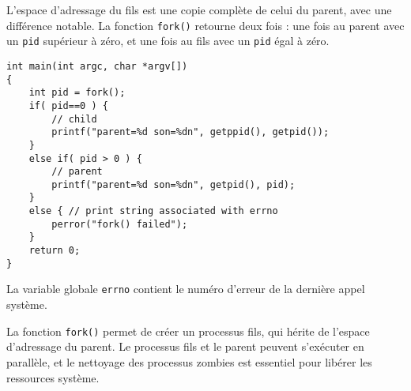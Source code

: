 \documentclass[12pt]{article}
\begin{document}
L'espace d'adressage du fils est une copie complète de celui du parent, avec une différence notable. La fonction \texttt{fork()} retourne deux fois : une fois au parent avec un \texttt{pid} supérieur à zéro, et une fois au fils avec un \texttt{pid} égal à zéro.

\begin{lstlisting}
int main(int argc, char *argv[])
{
    int pid = fork();
    if( pid==0 ) {
        // child
        printf("parent=%d son=%dn", getppid(), getpid());
    }
    else if( pid > 0 ) {
        // parent
        printf("parent=%d son=%dn", getpid(), pid);
    }
    else { // print string associated with errno
        perror("fork() failed");
    }
    return 0;
}
\end{lstlisting}

La variable globale \texttt{errno} contient le numéro d'erreur de la dernière appel système.

\begin{tcolorbox}[title={À retenir}]
La fonction \texttt{fork()} permet de créer un processus fils, qui hérite de l'espace d'adressage du parent. Le processus fils et le parent peuvent s'exécuter en parallèle, et le nettoyage des processus zombies est essentiel pour libérer les ressources système.
\end{tcolorbox}
\end{document}

